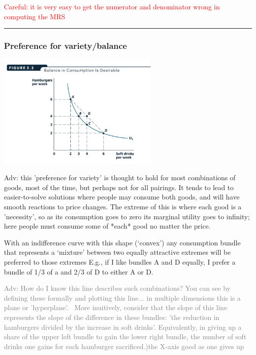 \documentclass[]{article}
\begin{document}
\textcolor{red}{Careful: it is very easy to get the numerator and denominator wrong in computing the MRS}

\begin{center}\rule{0.5\linewidth}{\linethickness}\end{center}

\hypertarget{preference-for-varietybalance}{%
\subsubsection{Preference for variety/balance}\label{preference-for-varietybalance}}

\includegraphics[height=2.2in]{picsfigs/indifcurvebalance.png}

\textcolor{RawSienna}{Adv: this 'preference for variety' is thought to hold for most combinations of goods, most of the time, but perhaps not for all pairings.
It tends to lead to easier-to-solve solutions where people may consume both goods, and will have smooth reactions to price changes.
The extreme of this is where each good is a 'necessity', so as its consumption goes to zero its marginal utility goes to infinity; here people must consume some of *each* good no matter the price.}

With an indifference curve with this shape (`convex') any consumption bundle that represents a `mixture' between two equally attractive extremes will be preferred to those extremes
E.g., if I like bundles A and D equally, I prefer a bundle of 1/3 of a and 2/3 of D to either A or D.

\textcolor{gray}{Adv: How do I know this line describes such combinations? You can see by defining these formally and plotting this line... in multiple dimensions this is a plane or 'hyperplane'. \
More inuitively, consider that the slope of this line represents the slope of the difference in these bundles: 'the reduction in hamburgers divided by the increase in soft drinks'. Equivalently, in giving up a share of the upper left  bundle to gain the lower right bundle, the number of soft drinks one gains for each hamburger sacrificed.)the X-axis good as one gives up}
\end{document}
